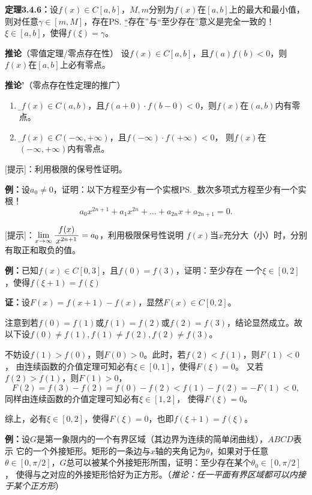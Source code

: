 {\bf 定理3.4.6：}设$f(x)\in C[a,b]$，$M,m$分别为$f(x)$在$[a,b]$上的最大和最小值，
则对任意$\gamma\in[m,M]$，存在\ps{\b “存在”与“至少存在”意义是完全一致的！}
$\xi\in[a,b]$，使得$f(\xi)=\gamma$。

{\bf 推论}（零值定理/零点存在性）
设$f(x)\in C[a,b]$，且$f(a)f(b)<0$，则$f(x)$在$[a,b]$上必有零点。

{\bf 推论'}（零点存在性定理的推广）
\begin{enumerate}[(1)]
  \setlength{\itemindent}{1cm}
  \item {\b 设$f(x)\in C(a,b)$，且$f(a+0)\cdot f(b-0)<0$，则$f(x)$在$(a,b)$内有零点。} 
  \item {\b 设$f(x)\in C(-\infty,+\infty)$，且$f(-\infty)\cdot f(+\infty)<0$，
  则$f(x)$在$(-\infty,+\infty)$内有零点。}
\end{enumerate}

[提示]：利用极限的保号性证明。

{\bf 例：}设$a_0\ne 0$，证明：以下方程至少有一个实根\ps{\b 奇数次多项式方程至少有一个实根！}
$$a_0x^{2n+1}+a_1x^{2n}+\ldots+a_{2n}x+a_{2n+1}=0.$$

[提示]：$\lim\limits_{x\to{\infty}}\displaystyle\frac{\,{f(x)}\,}{\,{x^{2n+1}}\,}=a_0$，利用极限保号性说明
$f(x)$当$x$充分大（小）时，分别有取正和取负的值。

{\bf 例：}已知$f(x)\in C[0,3]$，且$f(0)=f(3)$，证明：至少存在
一个$\xi\in[0,2]$，使得$f(\xi+1)=f(\xi)$

{\bf 证：}设$F(x)=f(x+1)-f(x)$，显然$F(x)\in C[0,2]$。

注意到若$f(0)=f(1)$或$f(1)=f(2)$或$f(2)=f(3)$，结论显然成立。故以下设$f(0)\ne f(1),
f(1)\ne f(2),f(2)\ne f(3)$。

不妨设$f(1)>f(0)$，则$F(0)>0$。此时，若$f(2)<f(1)$，则$F(1)<0$，
由连续函数的介值定理可知必有$\xi\in[0,1]$，使得$F(\xi)=0$。
又若$f(2)>f(1)$，则$F(1)>0$，
$$F(2)=f(3)-f(2)=f(0)-f(2)<f(1)-f(2)=-F(1)<0,$$
同样由连续函数的介值定理可知必有$\xi\in[1,2]$，
使得$F(\xi)=0$。

综上，必有$\xi\in[0,2]$，使得$F(\xi)=0$，也即$f(\xi+1)=f(\xi)$。

{\bf 例：}设$G$是第一象限内的一个有界区域（其边界为连续的简单闭曲线），$ABCD$表示
它的一个外接矩形。矩形的一条边与$x$轴的夹角记为$\theta$，如果对于任意$\theta\in
[0,\pi/2]$，$G$总可以被某个外接矩形所围，证明：至少存在某个$\theta_0\in[0,\pi/2]$，
使得与之对应的外接矩形恰好为正方形。（{\it 推论：任一平面有界区域都可以内接于某个正方形}）


